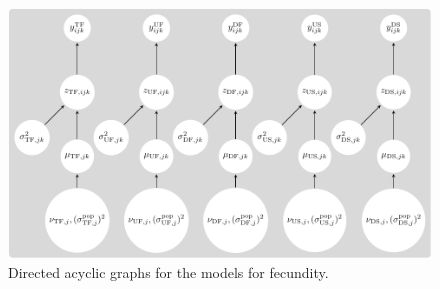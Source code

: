 \documentclass[12pt, oneside, titlepage]{article}   	%
\begin{document}
\begin{figure}[!h]
       \includegraphics[scale=1]{../../manuscript/figures/dag-fecundity.pdf}  
    \caption{ Directed acyclic graphs for the models for fecundity. }
 \label{fig:dag-fecundity}
\end{figure}


\end{document}
